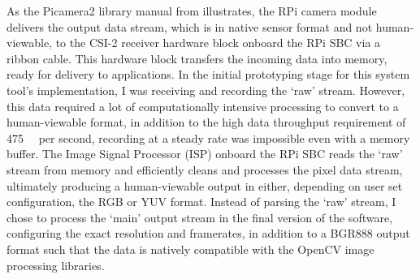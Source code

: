 As the Picamera2 library manual from \cite{raspberrypiltdPicamera2Library2024} illustrates, the RPi camera module delivers the output data stream, which is in native sensor format and not human-viewable, to the CSI-2 receiver hardware block onboard the RPi SBC via a ribbon cable. This hardware block transfers the incoming data into memory, ready for delivery to applications. In the initial prototyping stage for this system tool's implementation, I was receiving and recording the `raw' stream. However, this data required a lot of computationally intensive processing to convert to a human-viewable format, in addition to the high data throughput requirement of \SI{475}{\mega\byte} per second, recording at a steady rate was impossible even with a memory buffer. The Image Signal Processor (ISP) onboard the RPi SBC reads the `raw' stream from memory and efficiently cleans and processes the pixel data stream, ultimately producing a human-viewable output in either, depending on user set configuration, the RGB or YUV format. Instead of parsing the `raw' stream, I chose to process the `main' output stream in the final version of the software, configuring the exact resolution and framerates, in addition to a BGR888 output format such that the data is natively compatible with the OpenCV image processing libraries.

